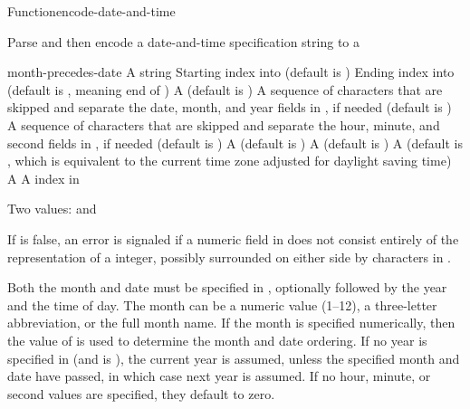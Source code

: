 \documentclass[10pt,twoside,english,pdftex]{article}
\begin{document}
\begin{functiondoc}{Function}{encode-date-and-time}{%
    }
% 

\fnsyntax

\fnpurpose Parse and then encode a date-and-time specification string to a

\fnpackage {} 

\fnmodule {}

\fnargs
\begin{args}{month-precedes-date}
\arg[string] A string
\arg[start] Starting index into  (default is )
\arg[end] Ending index into  (default is \nil, meaning
end of )
 A  (default is \nil)
 A sequence of characters that are skipped and separate the
 date, month, and year fields in , if needed (default is 
 )
 A sequence of characters that are skipped and separate the
 hour, minute, and second fields in , if needed (default is 
 )
 A  (default is 
)
 A  (default is \nil)
 A  (default is \nil,
  which is equivalent to the current time zone adjusted for daylight
  saving time)
 A  
\arg[position] A index in 
\end{args}

\fnreturns Two values:  and 

\fnerrors
%
If  is false, an error is signaled if a numeric field in
 does not consist entirely of the representation of a integer,
possibly surrounded on either side by characters in .

\fndescription
%
Both the month and date must be specified in , optionally followed
by the year and the time of day. The month can be a numeric value (1--12), a
three-letter abbreviation, or the full month name.  If the month is specified
numerically, then the value of  is used to
determine the month and date ordering. If no year is specified in 
(and  is \nil), the current year is assumed, unless the
specified month and date have passed, in which case next year is assumed.  If
no hour, minute, or second values are specified, they default to zero.


\end{functiondoc}
\end{document}
